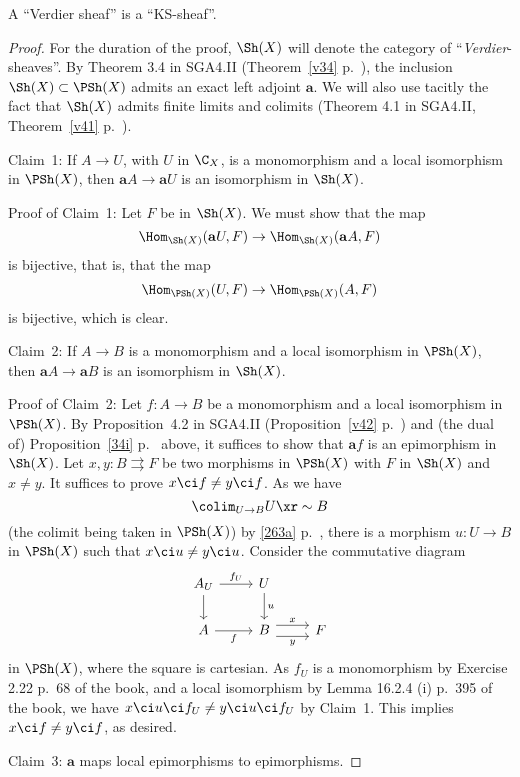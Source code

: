 \documentclass[12pt]{article}
\theoremstyle{remark}
\theoremstyle{definition}
\begin{document}
\begin{prop}
A ``Verdier sheaf'' is a ``KS-sheaf''.
\end{prop}
\begin{proof}
For the duration of the proof, $\Sh(X)$ will denote the category of ``\emph{Verdier}-sheaves''. By Theorem 3.4 in SGA4.II (Theorem~\ref{v34} p.~\pageref{v34}), the inclusion $\Sh(X)\subset\PSh(X)$ admits an exact left adjoint $\mathbf a$. We will also use tacitly the fact that $\Sh(X)$ admits finite limits and colimits (Theorem 4.1 in SGA4.II, Theorem~\ref{v41} p.~\pageref{v41}).

\nn Claim~1: If $A\to U$, with $U$ in $\C_X$, is a monomorphism and a local isomorphism in $\PSh(X)$, then $\mathbf aA\to\mathbf aU$ is an isomorphism in $\Sh(X)$.

\nn Proof of Claim~1: Let $F$ be in $\Sh(X)$. We must show that the map
$$
\Hom_{\Sh(X)}(\mathbf aU,F)\to\Hom_{\Sh(X)}(\mathbf aA,F)
$$ 
is bijective, that is, that the map
$$
\Hom_{\PSh(X)}(U,F)\to\Hom_{\PSh(X)}(A,F)
$$ 
is bijective, which is clear.

\nn Claim~2: If $A\to B$ is a monomorphism and a local isomorphism in $\PSh(X)$, then $\mathbf aA\to\mathbf aB$ is an isomorphism in $\Sh(X)$.

\nn Proof of Claim~2: Let $f:A\to B$ be a monomorphism and a local isomorphism in $\PSh(X)$. By Proposition~4.2 in SGA4.II (Proposition~\ref{v42} p.~\pageref{v42}) and (the dual of) Proposition~\ref{34i} p.~ above, it suffices to show that $\mathbf af$ is an epimorphism in $\Sh(X)$. Let $x,y:B\rightrightarrows F$ be two morphisms in $\PSh(X)$ with $F$ in $\Sh(X)$ and $x\ne y$. It suffices to prove $x\ci f\ne y\ci f$. 
As we have 
$$
\colim_{U\to B}U\xr\sim B
$$ 
(the colimit being taken in $\PSh(X)$) by \eqref{263a} p.~\pageref{263a}, there is a morphism $u:U\to B$ in $\PSh(X)$ such that $x\ci u\ne y\ci u$. Consider the commutative diagram 
$$
\begin{tikzcd}
A_U\ar[d]\ar[r,"f_U"]&U\ar[d,"u"]\\ 
A\ar[r,"f"']&B\ar[r,yshift=4pt,"x"]\ar[r,yshift=-4pt,"y"']&F
\end{tikzcd}
$$ 
in $\PSh(X)$, where the square is cartesian. As $f_U$ is a monomorphism by Exercise 2.22 p.~68 of the book, %
and a local isomorphism by Lemma 16.2.4 (i) p.~395 of the book, we have $x\ci u\ci f_U\ne y\ci u\ci f_U$ by Claim~1. This implies $x\ci f\ne y\ci f$, as desired.

\nn Claim~3: $\mathbf a$ maps local epimorphisms to epimorphisms.


\end{proof}
\end{document}
